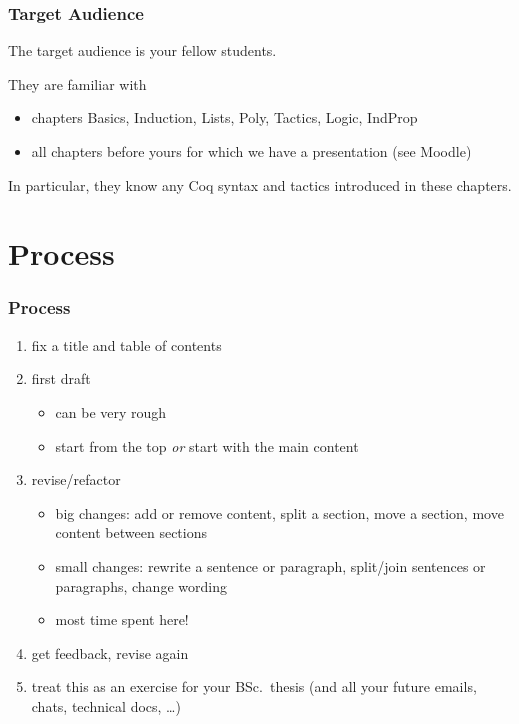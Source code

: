 \documentclass[xetex]{beamer}
\begin{document}
\begin{frame}
  \frametitle{Target Audience}

  The target audience is your fellow students.

  \medskip

  They are familiar with
  \begin{itemize}
    \item chapters Basics, Induction, Lists, Poly, Tactics, Logic, IndProp
    \item all chapters before yours for which we have a presentation (see Moodle)
  \end{itemize}

  \medskip

  In particular, they know any Coq syntax and tactics introduced in these chapters.
\end{frame}

\section{Process}

\begin{frame}
  \frametitle{Process}

  \begin{enumerate}[<+->]
    \item fix a title and table of contents
    \item first draft
          \begin{itemize}
            \item can be very rough
            \item start from the top \emph{or} start with the main content
          \end{itemize}
    \item revise/refactor
          \begin{itemize}
            \item big changes: add or remove content, split a section, move a section, move content between sections
            \item small changes: rewrite a sentence or paragraph, split/join sentences or paragraphs, change wording
            \item most time spent here!
          \end{itemize}
    \item get feedback, revise again
    \item treat this as an exercise for your BSc.\ thesis (and all your future emails, chats, technical docs, \dots)
  \end{enumerate}
\end{frame}
\end{document}
